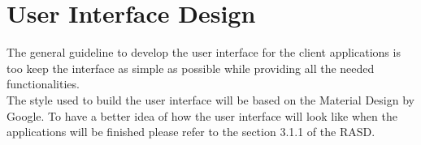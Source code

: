 \chapter{User Interface Design}
The general guideline to develop the user interface for the client applications is too keep the interface as simple as possible while providing all the needed functionalities.\\
The style used to build the user interface will be based on the Material Design by Google.
To have a better idea of how the user interface will look like when the applications will be finished please refer to the section 3.1.1 of the RASD.